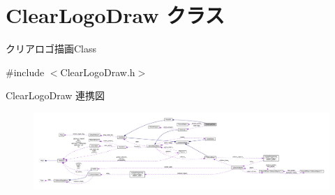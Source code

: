 \hypertarget{class_clear_logo_draw}{}\section{Clear\+Logo\+Draw クラス}
\label{class_clear_logo_draw}


クリアロゴ描画\+Class  




{\ttfamily \#include $<$Clear\+Logo\+Draw.\+h$>$}



Clear\+Logo\+Draw 連携図\nopagebreak
\begin{figure}[H]
\begin{center}
\leavevmode
\includegraphics[width=350pt]{class_clear_logo_draw__coll__graph}
\end{center}
\end{figure}
